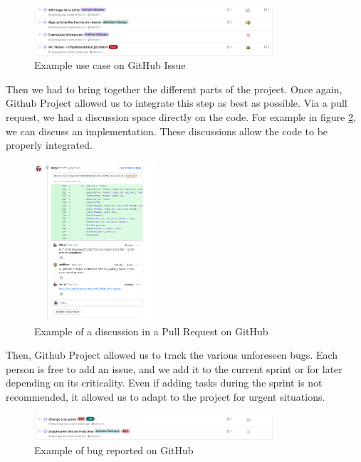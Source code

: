 \begin{figure}[h]
    \centering
    \includegraphics[width=0.8\textwidth]{img/GitHubUseCase}
    \caption{Example use case on GitHub Issue}
    \label{fig:GitHubUseCase}
\end{figure}

Then we had to bring together the different parts of the project.
Once again, Github Project allowed us to integrate this step as best as possible.
Via a pull request, we had a discussion space directly on the code.
For example in figure \ref{fig:GitHubPullRequest}, we can discuss an implementation.
These discussions allow the code to be properly integrated.

\begin{figure}[h]
    \centering
    \includegraphics[width=0.4\textwidth]{img/GitHubDiscuss}
    \caption{Example of a discussion in a Pull Request on GitHub}
    \label{fig:GitHubPullRequest}
\end{figure}

\newpage

Then, Github Project allowed us to track the various unforeseen bugs.
Each person is free to add an issue, and we add it to the current sprint or for later depending on its criticality.
Even if adding tasks during the sprint is not recommended, it allowed us to adapt to the project for urgent situations.

\begin{figure}[h]
    \centering
    \includegraphics[width=0.8\textwidth]{img/GitHubBug}
    \caption{Example of bug reported on GitHub}
    \label{fig:GitHubBug}
\end{figure}


